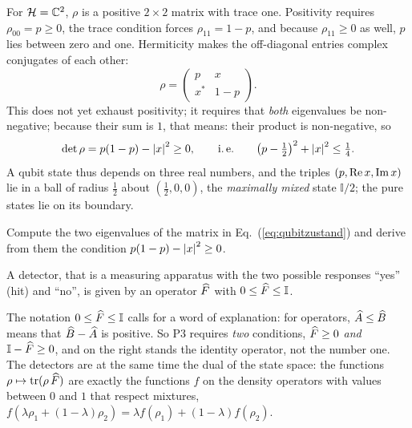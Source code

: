 \begin{example}
For $\mathcal{H} = \mathbb{C}^2$, $\rho$ is a positive $2\times 2$ matrix with trace one. Positivity requires $\rho_{00} = p\geq 0$, the trace condition forces $\rho_{11} = 1-p$, and because $\rho_{11}\geq 0$ as well, $p$ lies between zero and one. Hermiticity makes the off-diagonal entries complex conjugates of each other:
\begin{equation}\label{eq:qubitzustand}
	\rho = \begin{pmatrix} p & x \\ x^* & 1-p\end{pmatrix}.
\end{equation}
This does not yet exhaust positivity; it requires that \emph{both} eigenvalues be non-negative; because their sum is $1$, that means: their product is non-negative, so
\begin{equation}
	\det\rho = p(1-p) - \left\lvert x \right\rvert^2 \geq 0, \qquad \text{i.\,e.} \qquad \bigl(p-\tfrac12\bigr)^2 + \left\lvert x \right\rvert^2 \leq \tfrac14.
\end{equation}
A qubit state thus depends on three real numbers, and the triples $(p, \operatorname{Re} x, \operatorname{Im} x)$ lie in a ball of radius $\tfrac12$ about $(\tfrac12, 0, 0)$, the \emph{maximally mixed} state $\mathbb{I}/2$; the pure states lie on its boundary.
\end{example}

\begin{exercise}
Compute the two eigenvalues of the matrix in Eq.~(\ref{eq:qubitzustand}) and derive from them the condition $p(1-p) - \left\lvert x \right\rvert^2 \ge 0$.
\end{exercise}

\begin{merksatz}[P3]
	A detector, that is a measuring apparatus with the two possible responses ``yes'' (hit) and ``no'', is given by an operator $\widehat{F}$ with $0 \leq \widehat{F} \leq \mathbb{I}$.
\end{merksatz}
The notation $0 \leq \widehat{F} \leq \mathbb{I}$ calls for a word of explanation: for operators, $\widehat{A}\leq\widehat{B}$ means that $\widehat{B}-\widehat{A}$ is positive. So P3 requires \emph{two} conditions, $\widehat{F}\geq 0$ \emph{and} $\mathbb{I}-\widehat{F}\geq 0$, and on the right stands the identity operator, not the number one. The detectors are at the same time the dual of the state space: the functions $\rho\mapsto\operatorname{tr}(\rho\,\widehat{F})$ are exactly the functions $f$ on the density operators with values between $0$ and $1$ that respect mixtures, $f(\lambda\rho_1 + (1-\lambda)\rho_2) = \lambda f(\rho_1) + (1-\lambda)f(\rho_2)$.

